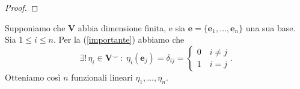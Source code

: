 \documentclass{article}
\theoremstyle{plain}
\theoremstyle{definition}
\theoremstyle{remark}
\begin{document}
\begin{proof}
%
%
%
%
%
%
\end{proof}

\vspace{10pt}

Supponiamo che $\mathbf{V}$ abbia dimensione finita, e sia $\mathbf{e}=\{\mathbf{e}_1,\ldots,\mathbf{e}_n\}$ una sua base.
Sia $1\leq i\leq n$. Per la (\ref{importante}) abbiamo che 
\begin{equation}\label{baseduale}
    \exists!\,\eta_i\in\mathbf{V}^\smallsmile\,:\;\eta_i(\mathbf{e}_j)=\delta_{ij}=\begin{cases}
        0\quad i\neq j\\
        1\quad i=j
    \end{cases}.
\end{equation}
Otteniamo così $n$ funzionali lineari $\eta_1,\ldots,\eta_n$.
\end{document}
